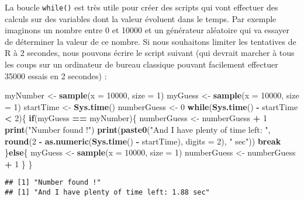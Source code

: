 \documentclass[]{book}
\newenvironment{Shaded}{\begin{snugshade}}{\end{snugshade}}
\newcommand{\KeywordTok}[1]{\textcolor[rgb]{0.13,0.29,0.53}{\textbf{#1}}}
\newcommand{\DataTypeTok}[1]{\textcolor[rgb]{0.13,0.29,0.53}{#1}}
\newcommand{\DecValTok}[1]{\textcolor[rgb]{0.00,0.00,0.81}{#1}}
\newcommand{\StringTok}[1]{\textcolor[rgb]{0.31,0.60,0.02}{#1}}
\newcommand{\ControlFlowTok}[1]{\textcolor[rgb]{0.13,0.29,0.53}{\textbf{#1}}}
\newcommand{\OperatorTok}[1]{\textcolor[rgb]{0.81,0.36,0.00}{\textbf{#1}}}
\newcommand{\NormalTok}[1]{#1}
\theoremstyle{definition}
\theoremstyle{definition}
\theoremstyle{definition}
\theoremstyle{remark}
\begin{document}
La boucle \texttt{while()} est très utile pour créer des scripts qui
vont effectuer des calculs sur des variables dont la valeur évoluent
dans le temps. Par exemple imaginons un nombre entre 0 et 10000 et un
générateur aléatoire qui va essayer de déterminer la valeur de ce
nombre. Si nous souhaitons limiter les tentatives de R à 2 secondes,
nous pouvons écrire le script suivant (qui devrait marcher à tous les
coups sur un ordinateur de bureau classique pouvant facilement effectuer
35000 essais en 2 secondes) :

\begin{Shaded}
\begin{Highlighting}[]
\NormalTok{myNumber <-}\StringTok{ }\KeywordTok{sample}\NormalTok{(}\DataTypeTok{x =} \DecValTok{10000}\NormalTok{, }\DataTypeTok{size =} \DecValTok{1}\NormalTok{)}
\NormalTok{myGuess <-}\StringTok{ }\KeywordTok{sample}\NormalTok{(}\DataTypeTok{x =} \DecValTok{10000}\NormalTok{, }\DataTypeTok{size =} \DecValTok{1}\NormalTok{)}
\NormalTok{startTime <-}\StringTok{ }\KeywordTok{Sys.time}\NormalTok{()}
\NormalTok{numberGuess <-}\StringTok{ }\DecValTok{0}
\ControlFlowTok{while}\NormalTok{(}\KeywordTok{Sys.time}\NormalTok{() }\OperatorTok{-}\StringTok{ }\NormalTok{startTime }\OperatorTok{<}\StringTok{ }\DecValTok{2}\NormalTok{)\{}
  \ControlFlowTok{if}\NormalTok{(myGuess }\OperatorTok{==}\StringTok{ }\NormalTok{myNumber)\{}
\NormalTok{    numberGuess <-}\StringTok{ }\NormalTok{numberGuess }\OperatorTok{+}\StringTok{ }\DecValTok{1}
    \KeywordTok{print}\NormalTok{(}\StringTok{"Number found !"}\NormalTok{)}
    \KeywordTok{print}\NormalTok{(}\KeywordTok{paste0}\NormalTok{(}\StringTok{"And I have plenty of time left: "}\NormalTok{, }
      \KeywordTok{round}\NormalTok{(}\DecValTok{2} \OperatorTok{-}\StringTok{ }\KeywordTok{as.numeric}\NormalTok{(}\KeywordTok{Sys.time}\NormalTok{() }\OperatorTok{-}\StringTok{ }\NormalTok{startTime), }\DataTypeTok{digits =} \DecValTok{2}\NormalTok{), }
      \StringTok{" sec"}\NormalTok{))}
    \ControlFlowTok{break}
\NormalTok{  \}}\ControlFlowTok{else}\NormalTok{\{}
\NormalTok{    myGuess <-}\StringTok{ }\KeywordTok{sample}\NormalTok{(}\DataTypeTok{x =} \DecValTok{10000}\NormalTok{, }\DataTypeTok{size =} \DecValTok{1}\NormalTok{)}
\NormalTok{    numberGuess <-}\StringTok{ }\NormalTok{numberGuess }\OperatorTok{+}\StringTok{ }\DecValTok{1}
\NormalTok{  \}}
\NormalTok{\}}
\end{Highlighting}
\end{Shaded}

\begin{verbatim}
## [1] "Number found !"
## [1] "And I have plenty of time left: 1.88 sec"
\end{verbatim}
\end{document}
